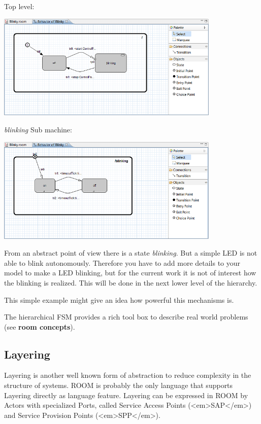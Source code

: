 Top level:

\includegraphics[width=0.8\textwidth]{images/020-Blinky15.png}

\textit{blinking} Sub machine:

\includegraphics[width=0.8\textwidth]{images/020-Blinky151.png}

From an abstract point of view there is a state \textit{blinking}. But a simple LED is not able to blink 
autonomously. Therefore you have to add more details to your model to make a LED blinking, but for the 
current work it is not of interest how the blinking is realized. This will be done in the next lower level 
of the hierarchy. 

This simple example might give an idea how powerful this mechanisms is.

The hierarchical FSM provides a rich tool box to describe real world problems (see \textbf{room concepts}).

\subsection{Layering}

Layering is another well known form of abstraction to reduce complexity in the structure of systems. ROOM 
is probably the only language that supports Layering directly as language feature.
Layering can be expressed in ROOM by Actors with specialized Ports, called Service Access Points 
(<em>SAP</em>) and Service Provision Points (<em>SPP</em>).

